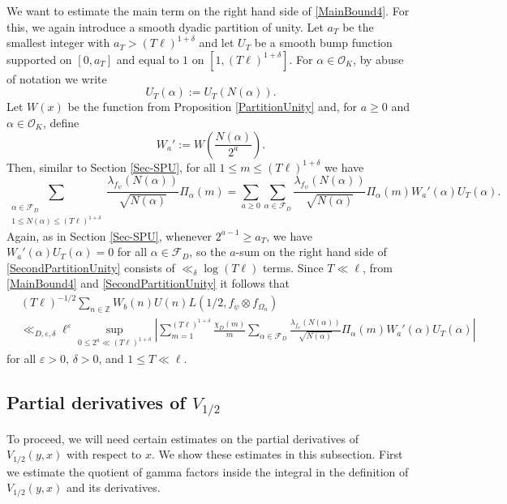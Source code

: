 \documentclass[11pt]{amsart}
\newcommand{\bigo}{\mathcal{O}}
\newcommand{\Z}{\mathbb{Z}}
\theoremstyle{definition}
\theoremstyle{remark}
\begin{document}
We want to estimate the main term on the right hand side of \eqref{MainBound4}. For this, we again introduce a smooth dyadic partition of unity. Let $a_T$ be the smallest integer with $a_T > (T\ell)^{1+\delta}$ and let $U_T$ be a smooth bump function supported on $[0,a_T]$ and equal to $1$ on $[1,(T\ell)^{1+\delta}]$. For $\alpha \in \bigo_K$, by abuse of notation we write $$ U_T(\alpha) := U_T(N(\alpha)).$$ Let $W(x)$ be the function from Proposition \ref{PartitionUnity} and, for $a\geq 0$ and $\alpha \in \bigo_K$, define $$ W_{a}' := W\left( \frac{N(\alpha)}{2^{a}} \right).$$ 
Then, similar to Section \ref{Sec-SPU}, for all $1\leq m\leq (T\ell)^{1+\delta}$ we have 
\begin{equation}
    \sum_{\substack{\alpha \in \mathcal{F}_{D} \\ 1\leq N(\alpha) \leq (T\ell)^{1+\delta}}} \frac{\lambda_{f_{\psi}}(N(\alpha))}{\sqrt{N(\alpha)}} \Pi_{\alpha}(m) = \sum_{a\geq 0} \sum_{\alpha \in \mathcal{F}_{D}} \frac{\lambda_{f_{\psi}}(N(\alpha))}{\sqrt{N(\alpha)}} \Pi_{\alpha}(m) W_{a}'(\alpha) U_T(\alpha). \label{SecondPartitionUnity}
\end{equation}
Again, as in Section \ref{Sec-SPU}, whenever $2^{a-1} \geq a_T$, we have $W_{a}'(\alpha) U_T(\alpha)=0$ for all $\alpha \in \mathcal{F}_{D}$, so the $a$-sum on the right hand side of \eqref{SecondPartitionUnity} consists of $\ll_{\delta} \log(T\ell)$ terms. Since $T\ll \ell$, from \eqref{MainBound4} and \eqref{SecondPartitionUnity} it follows that
\begin{align}
    &(T\ell)^{-1/2} \sum_{n\in \Z} W_{b}(n) U(n) L(1/2,f_{\psi}\otimes f_{\Omega_n}) \label{MainBound5} \\
    &\ll_{D, \varepsilon, \delta} \ell^{\varepsilon} \sup_{0\leq 2^{a} \ll (T\ell)^{1+\delta}} \left| \sum_{m=1}^{(T\ell)^{1+\delta}} \frac{\chi_{D}(m)}{m} \sum_{\alpha \in \mathcal{F}_{D}} \frac{\lambda_{f_{\psi}}(N(\alpha))}{\sqrt{N(\alpha)}} \Pi_{\alpha}(m) W_{a}'(\alpha) U_T(\alpha) \right| \nonumber
\end{align}
for all $\varepsilon>0$, $\delta>0$, and $1\leq T \ll \ell$.




\subsection{Partial derivatives of \texorpdfstring{$V_{1/2}$}{V1/2}}

To proceed, we will need certain estimates on the partial derivatives of $V_{1/2}(y,x)$ with respect to $x$. We show these estimates in this subsection. First we estimate the quotient of gamma factors inside the integral in the definition of $V_{1/2}(y,x)$ and its derivatives.
\end{document}

